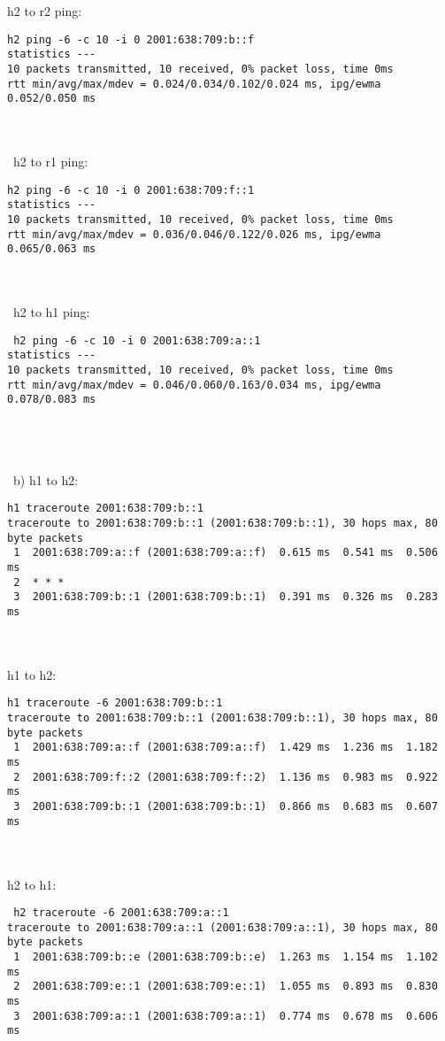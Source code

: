 \documentclass[a4paper]{article}
\begin{document}
h2 to r2 ping:
\begin{verbatim}
h2 ping -6 -c 10 -i 0 2001:638:709:b::f
statistics ---
10 packets transmitted, 10 received, 0% packet loss, time 0ms
rtt min/avg/max/mdev = 0.024/0.034/0.102/0.024 ms, ipg/ewma 0.052/0.050 ms
\end{verbatim}\\\\\
h2 to r1 ping:
\begin{verbatim}
h2 ping -6 -c 10 -i 0 2001:638:709:f::1
statistics ---
10 packets transmitted, 10 received, 0% packet loss, time 0ms
rtt min/avg/max/mdev = 0.036/0.046/0.122/0.026 ms, ipg/ewma 0.065/0.063 ms
\end{verbatim}\\\\\
h2 to h1 ping:
\begin{verbatim}
 h2 ping -6 -c 10 -i 0 2001:638:709:a::1
statistics ---
10 packets transmitted, 10 received, 0% packet loss, time 0ms
rtt min/avg/max/mdev = 0.046/0.060/0.163/0.034 ms, ipg/ewma 0.078/0.083 ms
\end{verbatim}\\\\\\\
b)
h1 to h2:
\begin{verbatim}
h1 traceroute 2001:638:709:b::1
traceroute to 2001:638:709:b::1 (2001:638:709:b::1), 30 hops max, 80 byte packets
 1  2001:638:709:a::f (2001:638:709:a::f)  0.615 ms  0.541 ms  0.506 ms
 2  * * *
 3  2001:638:709:b::1 (2001:638:709:b::1)  0.391 ms  0.326 ms  0.283 ms
\end{verbatim}\\\\
h1 to h2:
\begin{verbatim}
h1 traceroute -6 2001:638:709:b::1
traceroute to 2001:638:709:b::1 (2001:638:709:b::1), 30 hops max, 80 byte packets
 1  2001:638:709:a::f (2001:638:709:a::f)  1.429 ms  1.236 ms  1.182 ms
 2  2001:638:709:f::2 (2001:638:709:f::2)  1.136 ms  0.983 ms  0.922 ms
 3  2001:638:709:b::1 (2001:638:709:b::1)  0.866 ms  0.683 ms  0.607 ms
\end{verbatim}\\\\
h2 to h1:
\begin{verbatim}
 h2 traceroute -6 2001:638:709:a::1
traceroute to 2001:638:709:a::1 (2001:638:709:a::1), 30 hops max, 80 byte packets
 1  2001:638:709:b::e (2001:638:709:b::e)  1.263 ms  1.154 ms  1.102 ms
 2  2001:638:709:e::1 (2001:638:709:e::1)  1.055 ms  0.893 ms  0.830 ms
 3  2001:638:709:a::1 (2001:638:709:a::1)  0.774 ms  0.678 ms  0.606 ms
\end{verbatim}\\\\
\end{document}
